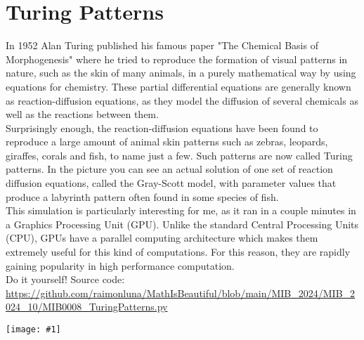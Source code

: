 \documentclass[12pt,landscape]{article}
\newcommand{\artpage}[3][]{%
  \begin{minipage}[t]{0.48\linewidth}
    \vspace{0pt} %
    \section*{#2} %
    \addcontentsline{toc}{section}{#2} %
    #3 %
  \end{minipage}%
  \hfill
  \begin{minipage}[t]{0.48\linewidth}
    \vspace{0pt} %
    \centering
    \texttt{[image: \#1]}
  \end{minipage}%
  \newpage
}
\begin{document}
\artpage[../Output/LowQuality/MIB0008_TuringPatterns.png]{Turing Patterns}{%
In 1952 Alan Turing published his famous paper "The Chemical Basis of Morphogenesis" where he tried to reproduce the formation of visual patterns in nature, such as the skin of many animals, in a purely mathematical way by using equations for chemistry. These partial differential equations are generally known as reaction-diffusion equations, as they model the diffusion of several chemicals as well as the reactions between them.\\

Surprisingly enough, the reaction-diffusion equations have been found to reproduce a large amount of animal skin patterns such as zebras, leopards, giraffes, corals and fish, to name just a few. Such patterns are now called Turing patterns. In the picture you can see an actual solution of one set of reaction diffusion equations, called the Gray-Scott model, with parameter values that produce a labyrinth pattern often found in some species of fish.\\

This simulation is particularly interesting for me, as it ran in a couple minutes in a Graphics Processing Unit (GPU). Unlike the standard Central Processing Units (CPU), GPUs have a parallel computing architecture which makes them extremely useful for this kind of computations. For this reason, they are rapidly gaining popularity in high performance computation.\\

Do it yourself! Source code: \url{https://github.com/raimonluna/MathIsBeautiful/blob/main/MIB_2024/MIB_2024_10/MIB0008_TuringPatterns.py}
}
\end{document}

